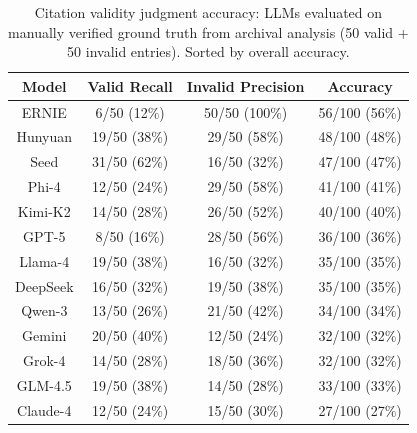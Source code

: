 \begin{table}[t]
  \centering
  \begin{threeparttable}
    \caption{Citation validity judgment accuracy: LLMs evaluated on manually verified ground truth from archival analysis (50 valid + 50 invalid entries). Sorted by overall accuracy.}
    \label{tab:judge_accuracy}
    \footnotesize
{}
\begin{tabular}{cccc}
\toprule
\textbf{Model} & \cellcolor{gray!12}\textbf{Valid Recall} & \cellcolor{gray!12}\textbf{Invalid Precision} & \cellcolor{gray!12}\textbf{Accuracy} \\
\midrule
ERNIE & \cellcolor{red!16}6/50 (12\%) & \cellcolor{green!20}50/50 (100\%) & \cellcolor{green!10}56/100 (56\%) \\
Hunyuan & \cellcolor{green!7}19/50 (38\%) & \cellcolor{green!10}29/50 (58\%) & \cellcolor{red!9}48/100 (48\%) \\
Seed & \cellcolor{green!16}31/50 (62\%) & \cellcolor{red!12}16/50 (32\%) & \cellcolor{red!10}47/100 (47\%) \\
Phi-4 & \cellcolor{red!11}12/50 (24\%) & \cellcolor{green!10}29/50 (58\%) & \cellcolor{red!12}41/100 (41\%) \\
Kimi-K2 & \cellcolor{red!9}14/50 (28\%) & \cellcolor{green!7}26/50 (52\%) & \cellcolor{red!13}40/100 (40\%) \\
GPT-5 & \cellcolor{red!15}8/50 (16\%) & \cellcolor{green!9}28/50 (56\%) & \cellcolor{red!15}36/100 (36\%) \\
Llama-4 & \cellcolor{green!7}19/50 (38\%) & \cellcolor{red!12}16/50 (32\%) & \cellcolor{red!15}35/100 (35\%) \\
DeepSeek & \cellcolor{red!7}16/50 (32\%) & \cellcolor{red!9}19/50 (38\%) & \cellcolor{red!15}35/100 (35\%) \\
Qwen-3 & \cellcolor{red!10}13/50 (26\%) & \cellcolor{red!7}21/50 (42\%) & \cellcolor{red!16}34/100 (34\%) \\
Gemini & \cellcolor{green!9}20/50 (40\%) & \cellcolor{red!16}12/50 (24\%) & \cellcolor{red!17}32/100 (32\%) \\
Grok-4 & \cellcolor{red!9}14/50 (28\%) & \cellcolor{red!10}18/50 (36\%) & \cellcolor{red!17}32/100 (32\%) \\
GLM-4.5 & \cellcolor{green!7}19/50 (38\%) & \cellcolor{red!14}14/50 (28\%) & \cellcolor{red!16}33/100 (33\%) \\
Claude-4 & \cellcolor{red!11}12/50 (24\%) & \cellcolor{red!13}15/50 (30\%) & \cellcolor{red!19}27/100 (27\%) \\

\end{tabular}
\end{threeparttable}
\end{table}
